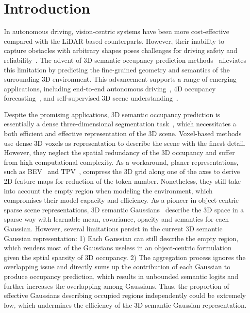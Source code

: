 \section{Introduction}
\label{sec:intro}
In autonomous driving, vision-centric systems have been more cost-effective compared with the LiDAR-based counterparts.
However, their inability to capture obstacles with arbitrary shapes poses challenges for driving safety and reliability~\cite{li2022bevformer,hu2022uniad,jiang2023vad,li2022bevdepth}. 
The advent of 3D semantic occupancy prediction methods~\cite{cao2022monoscene,miao2023occdepth,zhang2023occformer,wei2023surroundocc,jiang2023symphonize,huang2023tri,li2023voxformer,li2023fb} alleviates this limitation by predicting the fine-grained geometry and semantics of the surrounding 3D environment. 
This advancement supports a range of emerging applications, including end-to-end autonomous driving~\cite{occnet,hu2022uniad}, 4D occupancy forecasting~\cite{occworld,wang2024occsora,yan2024renderworld}, and self-supervised 3D scene understanding~\cite{selfocc,wimbauer2023behind,cao2023scenerf}.

Despite the promising applications, 3D semantic occupancy prediction is essentially a dense three-dimensional segmentation task~\cite{cao2022monoscene,tian2023occ3d}, which necessitates a both efficient and effective representation of the 3D scene.
Voxel-based methods~\cite{li2023voxformer,wei2023surroundocc} use dense 3D voxels as representation to describe the scene with the finest detail.
However, they neglect the spatial redundancy of the 3D occupancy and suffer from high computational complexity.
As a workaround, planer representations, such as BEV~\cite{li2022bevformer,yu2023flashocc} and TPV~\cite{huang2023tri}, compress the 3D grid along one of the axes to derive 2D feature maps for reduction of the token number.
Nonetheless, they still take into account the empty region when modeling the environment, which compromises their model capacity and efficiency.
As a pioneer in object-centric sparse scene representations, 3D semantic Gaussians~\cite{huang2024gaussian} describe the 3D space in a sparse way with learnable mean, covariance, opacity and semantics for each Gaussian.
However, several limitations persist in the current 3D semantic Gaussian representation:
1) Each Gaussian can still describe the empty region, which renders most of the Gaussians useless in an object-centric formulation given the sptial sparsity of 3D occupancy.
2) The aggregation process ignores the overlapping issue and directly sums up the contribution of each Gaussian to produce occupancy prediction, which results in unbounded semantic logits and further increases the overlapping among Gaussians.
Thus, the proportion of effective Gaussians describing occupied regions independently could be extremely low, which undermines the efficiency of the 3D semantic Gaussian representation.

